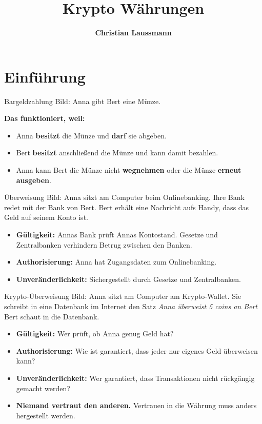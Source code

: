 \documentclass[aspectratio=169]{beamer}
\title{\textbf{\Huge Krypto Währungen}}
\author{\textcolor{secondarycolor}{\textbf{Christian Laussmann}}}
\date{}
\begin{document}
\frame{\titlepage}


\section{Einführung}


\begin{frame}{Bargeldzahlung}
    Bild: Anna gibt Bert eine Münze.

    \pause
    \textbf{Das funktioniert, weil:}
    \begin{itemize}
        \item Anna \textbf{besitzt} die Münze und \textbf{darf} sie abgeben.
        \item Bert \textbf{besitzt} anschließend die Münze und kann damit bezahlen.
        \item Anna kann Bert die Münze nicht \textbf{wegnehmen} oder die Münze \textbf{erneut ausgeben}.
    \end{itemize}
\end{frame}



\begin{frame}{Überweisung}
    Bild: Anna sitzt am Computer beim Onlinebanking. Ihre Bank redet mit der Bank von Bert. Bert erhält eine Nachricht aufs Handy, dass das Geld auf seinem Konto ist.

    \pause
    \begin{itemize}
        \item \textbf{Gültigkeit:} Annas Bank prüft Annas Kontostand. Gesetze und Zentralbanken verhindern Betrug zwischen den Banken.
        \item \textbf{Authorisierung:} Anna hat Zugangsdaten zum Onlinebanking.
        \item \textbf{Unveränderlichkeit:} Sichergestellt durch Gesetze und Zentralbanken.
    \end{itemize}
\end{frame}



\begin{frame}{Krypto-Überweisung}
    Bild: Anna sitzt am Computer am Krypto-Wallet. Sie schreibt in eine Datenbank im Internet den Satz \emph{Anna überweist 5 coins an Bert} Bert schaut in die Datenbank.

    \pause
    \begin{itemize}
        \item \textbf{Gültigkeit:} Wer prüft, ob Anna genug Geld hat?
        \item \textbf{Authorisierung:} Wie ist garantiert, dass jeder nur eigenes Geld überweisen kann?
        \item \textbf{Unveränderlichkeit:} Wer garantiert, dass Transaktionen nicht rückgängig gemacht werden?
    \end{itemize}

    \vfill
    \begin{itemize}
        \item \textbf{Niemand vertraut den anderen.} Vertrauen in die Währung muss anders hergestellt werden.
    \end{itemize}
\end{frame}
\end{document}
